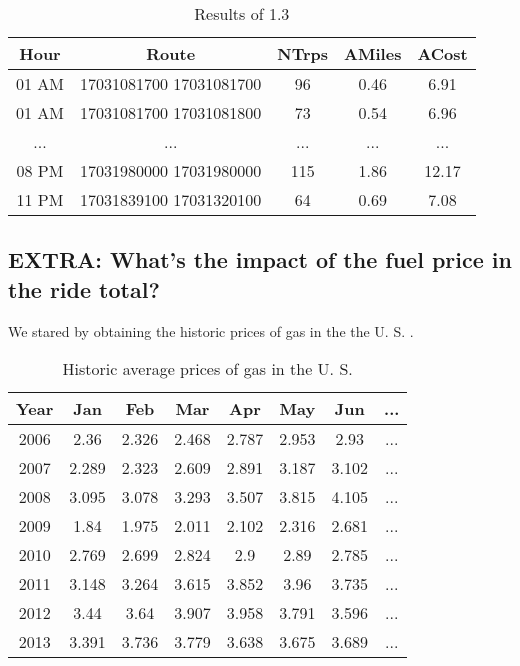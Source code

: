 \documentclass[conference,compsoc]{IEEEtran}
\begin{document}
\begin{table}[!t]
\renewcommand{\arraystretch}{1.3}
\caption{Results of 1.3}
\label{output_1_3}
\centering
\begin{tabular}{c|c||c|c|c}
\hline
\bfseries Hour & \bfseries Route & \bfseries NTrps & \bfseries AMiles & \bfseries ACost\\
\hline\hline

01 AM&17031081700 17031081700&96&0.46&6.91	\\
01 AM&17031081700 17031081800&73&0.54&6.96	\\
...&...&...&...&...	\\
08 PM&17031980000 17031980000&115&1.86&12.17\\
11 PM&17031839100 17031320100&64&0.69&7.08	\\

\hline
\end{tabular}
\end{table}

\subsection{EXTRA: What's the impact of the fuel price in the ride total?}
We stared by obtaining the historic prices of gas in the the U. S. \cite{IEEEhowto:oil_price}.

\begin{table}[!t]
\renewcommand{\arraystretch}{1.3}
\caption{Historic average prices of gas in the U. S.}
\label{oil_prices}
\centering
\begin{tabular}{c||c|c|c|c|c|c|c}
\hline
\bfseries Year&  \bfseries Jan&  \bfseries Feb& \bfseries Mar& \bfseries Apr& \bfseries May& \bfseries Jun& \bfseries ...\\
\hline\hline
2006& 2.36&2.326&2.468&2.787&2.953& 2.93&...\\
2007&2.289&2.323&2.609&2.891&3.187&3.102&...\\
2008&3.095&3.078&3.293&3.507&3.815&4.105&...\\
2009& 1.84&1.975&2.011&2.102&2.316&2.681&...\\
2010&2.769&2.699&2.824&  2.9& 2.89&2.785&...\\
2011&3.148&3.264&3.615&3.852& 3.96&3.735&...\\
2012& 3.44& 3.64&3.907&3.958&3.791&3.596&...\\
2013&3.391&3.736&3.779&3.638&3.675&3.689&...\\
\hline
\end{tabular}
\end{table}
\end{document}
